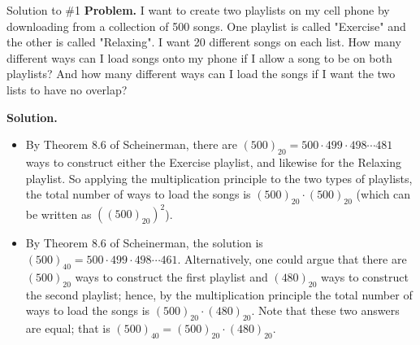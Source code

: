 \documentclass[dvipsnames, 10pt]{beamer}
\begin{document}
%
%
%
%
%
%	


\begin{frame}{Solution to \#1}
\small
\textbf{Problem.} I want to create two playlists on my cell phone by downloading from a collection of 500 songs. One playlist is called "Exercise" and the other is called "Relaxing".  I want 20 different songs on each list.  How many different ways can I load songs onto my phone if I allow a song to be on both playlists?  And how many different ways can I load the songs if I want the two lists to have no overlap? 

\vfill 

\textbf{Solution.}
\begin{itemize}
\item[a)] By Theorem 8.6 of Scheinerman, there are $(500)_{20} = 500 \cdot 499 \cdot 498 \cdots 481$ ways to construct either the Exercise playlist, and likewise for the Relaxing playlist.  So applying the multiplication principle to the two types of playlists, the total number of ways to load the songs is $(500)_{20} \cdot (500)_{20}$ (which can be written as $((500)_{20})^2$).
\item[b)] By Theorem 8.6 of Scheinerman, the solution is $(500)_{40} = 500 \cdot 499 \cdot 498 \cdots 461$.  Alternatively, one could argue that there are $(500)_{20}$ ways to construct the first playlist and $(480)_{20}$ ways to construct the second playlist; hence, by the multiplication principle the total number of ways to load the songs is  $(500)_{20} \cdot (480)_{20}$. Note that these two answers are equal; that is  $(500)_{40} = (500)_{20} \cdot (480)_{20}$.
\end{itemize}

% 
\end{frame}
\end{document}
